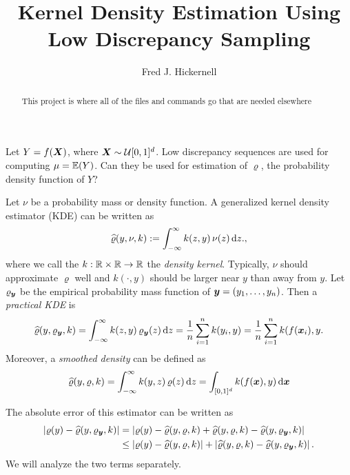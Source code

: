\documentclass{amsart}
\newcommand{\hvarrho}{\widehat{\varrho}}
\begin{document}
\title{Kernel Density Estimation Using Low Discrepancy Sampling}
\author{Fred J. Hickernell}
\begin{abstract}This project is where all of the files and commands go that are needed elsewhere
\end{abstract}

\maketitle

Let $Y = f(\boldsymbol{X})$, where $\boldsymbol{X} \sim \mathcal{U}[0,1]^d$.  Low discrepancy sequences are used for computing  $\mu = \operatorname{\mathbb{E}}(Y)$.  Can they be used for estimation of $\varrho$, the probability density function of $Y$?

Let $\nu$ be a probability mass or density function.  A generalized kernel density estimator (KDE) can be written as
\[
\hvarrho(y,\nu,k) := \int_{-\infty}^{\infty} k(z,y) \, \nu(z) \, \dif z.,
\]
where we call the $k:\mathbb{R} \times \mathbb{R} \to \mathbb{R}$ the \emph{density kernel}.  Typically, $\nu$ should approximate $\varrho$ well and $k(\cdot,y)$ should be larger near $y$ than away from $y$. 
Let $\varrho_{\boldsymbol{y}}$ be the empirical probability mass function of $\boldsymbol{y} = (y_1, \ldots, y_n)$.  Then a \emph{practical KDE} is 
\begin{equation*}
\hvarrho(y,\varrho_{\vy},k) = \int_{-\infty}^{\infty} k(z,y) \, \varrho_{\vy}(z) \, \dif z = \frac 1n \sum_{i=1}^n k(y_i,y) \\
 = \frac 1n \sum_{i=1}^n k(f(\vx_i),y .
\end{equation*}
Moreover, a \emph{smoothed density} can be defined as 
\[
\hvarrho(y,\varrho,k) = \int_{-\infty}^{\infty} k(y,z) \, \varrho(z) \, \dif z = \int_{[0,1]^d} k(f(\vx),y) \,  \dif \vx  
\]

The absolute error of this estimator can be written as 
\begin{align*}
    \abs{\varrho(y) - \hvarrho(y,\varrho_{\vy},k)} & = 
     \abs{\varrho(y) - \hvarrho(y,\varrho,k) + \hvarrho(y,\varrho,k) - \hvarrho(y,\varrho_{\vy},k)} \\
     & \le  \abs{\varrho(y) - \hvarrho(y,\varrho,k)} + \abs{\hvarrho(y,\varrho,k) - \hvarrho(y,\varrho_{\vy},k)}.
\end{align*}
We will analyze the two terms separately.
\end{document}
